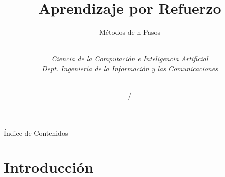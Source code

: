 \documentclass[10pt, envcountsect, handout, aspectratio=1610, hyperref={hypertexnames=true}]{beamer}
\title[Aprendizaje por Refuerzo]{Aprendizaje por Refuerzo}
\subtitle{Métodos de n-Pasos} %
\author[L. D. Hernández] %
{%
	\sc{Luis Daniel Hernández Molinero }\\ %
	\textit{Ciencia de la Computación e Inteligencia Artificial}\\  %
	\textit{Dept. Ingeniería de la Información y las Comunicaciones}\\  %
	\\   %
}
\institute[DIIC]%
{
	\textit{Universidad de Murcia}
}
\date{\arabic{lastyear} / \the\year} %
\begin{document}
	











\begin{frame}[plain]
	\titlepage
\end{frame}


\begin{frame}{Índice de Contenidos}
	\tableofcontents 
	
\note{

}

\end{frame}








\section{Introducción}

\end{document}
